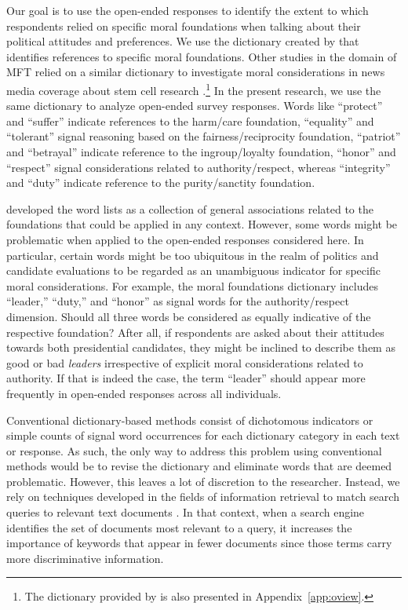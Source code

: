 \documentclass[12pt]{article}
\begin{document}
Our goal is to use the open-ended responses to identify the extent to which respondents relied on specific moral foundations when talking about their political attitudes and preferences. We use the dictionary created by \citet{graham2009liberals} that identifies references to specific moral foundations. Other studies in the domain of MFT relied on a similar dictionary to investigate moral considerations in news media coverage about stem cell research \citep{clifford2013words}.\footnote{The dictionary provided by \citet{graham2009liberals} is also presented in Appendix~\ref{app:oview}.} In the present research, we use the same dictionary to analyze open-ended survey responses. Words like ``protect'' and ``suffer'' indicate references to the harm/care foundation, ``equality'' and ``tolerant'' signal reasoning based on the fairness/reciprocity foundation, ``patriot'' and ``betrayal'' indicate reference to the ingroup/loyalty foundation, ``honor'' and ``respect'' signal considerations related to authority/respect, whereas ``integrity'' and ``duty'' indicate reference to the purity/sanctity foundation.

\citet{graham2009liberals} developed the word lists as a collection of general associations related to the foundations that could be applied in any context. However, some words might be problematic when applied to the open-ended responses considered here. In particular, certain words might be too ubiquitous in the realm of politics and candidate evaluations to be regarded as an unambiguous indicator for specific moral considerations. For example, the moral foundations dictionary includes ``leader,'' ``duty,'' and ``honor'' as signal words for the authority/respect dimension. Should all three words be considered as equally indicative of the respective foundation? After all, if respondents are asked about their attitudes towards both presidential candidates, they might be inclined to describe them as good or bad \textit{leaders} irrespective of explicit moral considerations related to authority. If that is indeed the case, the term ``leader'' should appear more frequently in open-ended responses across all individuals.

Conventional dictionary-based methods consist of dichotomous indicators or simple counts of signal word occurrences for each dictionary category in each text or response. As such, the only way to address this problem using conventional methods would be to revise the dictionary and eliminate words that are deemed problematic. However, this leaves a lot of discretion to the researcher. Instead, we rely on techniques developed in the fields of information retrieval to match search queries to relevant text documents \citep[see][for an introduction]{manning2008introduction}. In that context, when a search engine identifies the set of documents most relevant to a query, it increases the importance of keywords that appear in fewer documents since those terms carry more discriminative information. 
\end{document}
